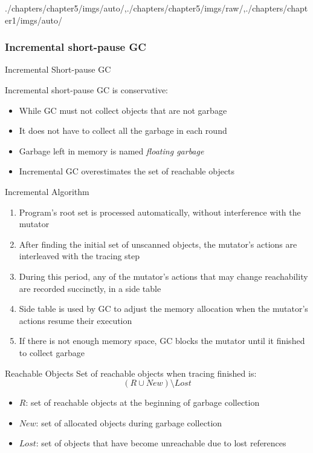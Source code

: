 \begin{graphicspathcontext}{{./chapters/chapter5/imgs/auto/},{./chapters/chapter5/imgs/raw/},{./chapters/chapter1/imgs/auto/}}
\begin{bibunit}[apalike]
\subsubsection{Incremental short-pause GC}
\subsubsectiontableofcontentslide

\begin{frame}[background=8]{Incremental Short-pause GC}
	\begin{alertblock}{}
		Incremental short-pause GC is conservative:
		\begin{itemize}
			\item While GC must not collect objects that are not garbage
			\item It does not have to collect all the garbage in each round
		\end{itemize}
	\end{alertblock}
	\vspace{1cm}
	\begin{itemize}
		\item Garbage left in memory is named \emph{floating garbage}
		\item Incremental GC overestimates the set of reachable objects
	\end{itemize}
\end{frame}

\begin{frame}[background=6]{Incremental Algorithm}
	\begin{enumerate}
		\item Program's root set is processed automatically, without interference with the mutator
		\vfill
		\item After finding the initial set of unscanned objects, the mutator's actions are interleaved with the tracing step
		\vfill
		\item During this period, any of the mutator's actions that may change reachability are recorded succinctly, in a side table
		\vfill
		\item Side table is used by GC to adjust the memory allocation when the mutator's actions resume their execution
		\vfill
		\item If there is not enough memory space, GC blocks the mutator until it finished to collect garbage
	\end{enumerate}
\end{frame}

\begin{frame}[background=8]{Reachable Objects}
	Set of reachable objects when tracing finished is:
	\[ \left( R \cup New \right) \setminus Lost \]
	\vfill
	\begin{itemize}
		\item $R$: set of reachable objects at the beginning of garbage collection
		\item $New$: set of allocated objects during garbage collection
		\item $Lost$:  set of objects that have become unreachable due to lost references
	\end{itemize}
\end{frame}


\end{bibunit}
\end{graphicspathcontext}
